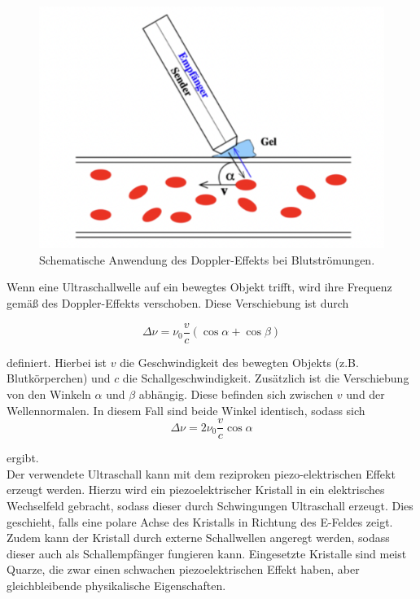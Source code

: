 \begin{figure}[H]
    \centering
    \includegraphics[width=\textwidth]{content/doppler.png}
    \caption{Schematische Anwendung des Doppler-Effekts bei Blutströmungen.\cite{sample}}
    \label{fig:blut}
\end{figure}

\noindent Wenn eine Ultraschallwelle auf ein bewegtes Objekt trifft, wird ihre Frequenz gemäß des Doppler-Effekts
verschoben. Diese Verschiebung ist durch

\begin{equation}
    \Delta\nu = \nu_0\dfrac{v}{c}(\cos{\alpha}+\cos{\beta})
    \label{eq:drei}
\end{equation}

\noindent definiert. Hierbei ist $v$ die Geschwindigkeit des bewegten Objekts (z.B. Blutkörperchen) und $c$ die Schallgeschwindigkeit.  
Zusätzlich ist die Verschiebung von den Winkeln $\alpha$ und $\beta$ abhängig. Diese befinden sich zwischen $v$ und der Wellennormalen.
In diesem Fall sind beide Winkel identisch, sodass sich 
\begin{equation}
    \Delta\nu = 2\nu_0\dfrac{v}{c}\cos{\alpha}
    \label{eq:vier}
\end{equation}

\noindent ergibt.\\
Der verwendete Ultraschall kann mit dem reziproken piezo-elektrischen Effekt erzeugt werden. 
Hierzu wird ein piezoelektrischer Kristall in ein elektrisches Wechselfeld gebracht, sodass 
dieser durch Schwingungen Ultraschall erzeugt. Dies geschieht, falls eine polare Achse des 
Kristalls in Richtung des E-Feldes zeigt. Zudem kann der Kristall durch externe Schallwellen
angeregt werden, sodass dieser auch als Schallempfänger fungieren kann. Eingesetzte Kristalle 
sind meist Quarze, die zwar einen schwachen piezoelektrischen Effekt haben, aber gleichbleibende 
physikalische Eigenschaften.

